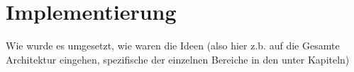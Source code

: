 \chapter{Implementierung}
\label{sec:implementation}

Wie wurde es umgesetzt, wie waren die Ideen (also hier z.b. auf die Gesamte Architektur eingehen, spezifische der einzelnen Bereiche in den unter Kapiteln)





  

 
 
 
 
 
 
 
 